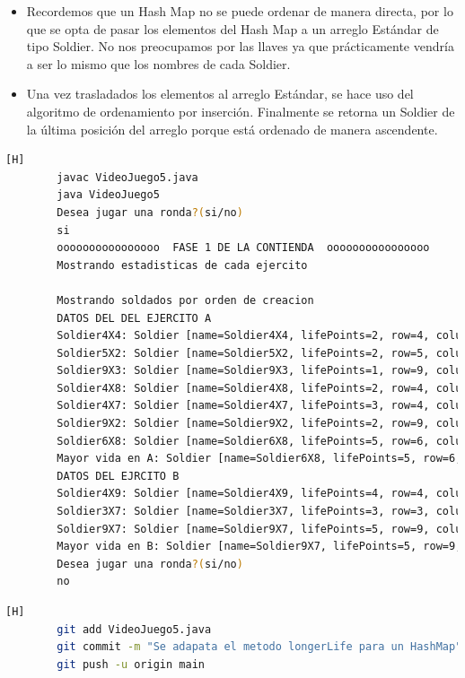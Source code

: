 \documentclass{article}
\begin{document}
	\begin{itemize}	
		\item Recordemos que un Hash Map no se puede ordenar de manera directa, por lo que se opta de pasar los elementos del Hash Map a un arreglo Estándar de tipo Soldier. No nos preocupamos por las llaves ya que prácticamente vendría a ser lo mismo que los nombres de cada Soldier. 
		\item Una vez trasladados los elementos al arreglo Estándar, se hace uso del algoritmo de ordenamiento por inserción. Finalmente se retorna un Soldier de la última posición del arreglo porque está ordenado de manera ascendente.
	\end{itemize}
	
	\begin{lstlisting}[language=bash,caption={Compilando y probando}][H]
		javac VideoJuego5.java
		java VideoJuego5
		Desea jugar una ronda?(si/no)
		si
		oooooooooooooooo  FASE 1 DE LA CONTIENDA  oooooooooooooooo
		Mostrando estadisticas de cada ejercito
		
		Mostrando soldados por orden de creacion
		DATOS DEL DEL EJERCITO A
		Soldier4X4: Soldier [name=Soldier4X4, lifePoints=2, row=4, column=4]
		Soldier5X2: Soldier [name=Soldier5X2, lifePoints=2, row=5, column=2]
		Soldier9X3: Soldier [name=Soldier9X3, lifePoints=1, row=9, column=3]
		Soldier4X8: Soldier [name=Soldier4X8, lifePoints=2, row=4, column=8]
		Soldier4X7: Soldier [name=Soldier4X7, lifePoints=3, row=4, column=7]
		Soldier9X2: Soldier [name=Soldier9X2, lifePoints=2, row=9, column=2]
		Soldier6X8: Soldier [name=Soldier6X8, lifePoints=5, row=6, column=8]
		Mayor vida en A: Soldier [name=Soldier6X8, lifePoints=5, row=6, column=8]
		DATOS DEL EJRCITO B
		Soldier4X9: Soldier [name=Soldier4X9, lifePoints=4, row=4, column=9]
		Soldier3X7: Soldier [name=Soldier3X7, lifePoints=3, row=3, column=7]
		Soldier9X7: Soldier [name=Soldier9X7, lifePoints=5, row=9, column=7]
		Mayor vida en B: Soldier [name=Soldier9X7, lifePoints=5, row=9, column=7]
		Desea jugar una ronda?(si/no)
		no
	\end{lstlisting}

	\begin{lstlisting}[language=bash,caption={Commit: 34a06097f486f0e96e4785f39e9311c655287aa7}][H]
		git add VideoJuego5.java
		git commit -m "Se adapata el metodo longerLife para un HashMap"			
		git push -u origin main
	\end{lstlisting}
	
	

	
	
\end{document}
